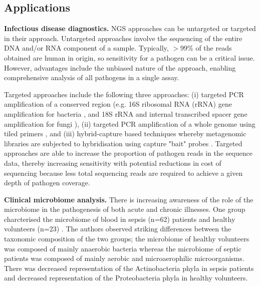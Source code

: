 \subsection{Applications}
\textbf{Infectious disease diagnostics.} NGS approaches can be untargeted or targeted in their approach. Untargeted approaches involve the sequencing of the entire DNA and/or RNA component of a sample. Typically, $>$99\% of the reads obtained are human in origin, so sensitivity for a pathogen can be a critical issue. However, advantages include the unbiased nature of the approach, enabling comprehensive analysis of all pathogens in a single assay. 

Targeted approaches include the following three approaches: (i) targeted PCR amplification of a conserved region (e.g. 16S ribosomal RNA (rRNA) gene amplification for bacteria \parencite{Watanabe2018}, and 18S rRNA and internal transcribed spacer gene amplification for fungi \parencite{Wagner2018}), (ii) targeted PCR amplification of a whole genome using tiled primers \parencite{Quick2017}, and (iii) hybrid-capture based techniques whereby metagenomic libraries are subjected to hybridisation using capture "bait" probes \parencite{Bonsall2015}. Targeted approaches are able to increase the proportion of pathogen reads in the sequence data, thereby increasing sensitivity with potential reductions in cost of sequencing because less total sequencing reads are required to achieve a given depth of pathogen coverage.

\textbf{Clinical microbiome analysis.} There is increasing awareness of the role of the microbiome in the pathogenesis of both acute and chronic illnesses. One group charcterised the microbiome of blood in sepsis (n=62) patients and healthy volunteers (n=23) \parencite{Gosiewski2017}. The authors observed striking differences between the taxonomic composition of the two groups; the microbiome of healthy volunteers was composed of mainly anaerobic bacteria whereas the microbiome of septic patients was composed of mainly aerobic and microaerophilic microorganisms. There was decreased representation of the Actinobacteria phyla in sepsis patients and decreased representation of the Proteobacteria phyla in healthy volunteers. 
 
